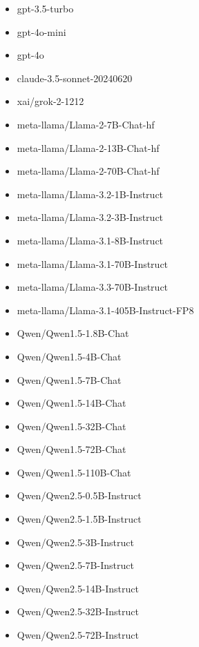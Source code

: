 \begin{itemize}
    \item gpt-3.5-turbo~\cite{openai2023gpt35turbofinetuning}
    \item gpt-4o-mini~\cite{openai2024gpt4o}
    \item gpt-4o~\cite{openai2024gpt4o}
    \item claude-3.5-sonnet-20240620~\cite{anthropic2024claude3}
    \item xai/grok-2-1212~\cite{grok2}

    \item meta-llama/Llama-2-7B-Chat-hf~\cite{touvron2023llama}
    \item meta-llama/Llama-2-13B-Chat-hf~\cite{touvron2023llama}
    \item meta-llama/Llama-2-70B-Chat-hf~\cite{touvron2023llama}

    \item meta-llama/Llama-3.2-1B-Instruct~\cite{dubey2024llama}
    \item meta-llama/Llama-3.2-3B-Instruct~\cite{dubey2024llama}
    \item meta-llama/Llama-3.1-8B-Instruct~\cite{dubey2024llama}
    \item meta-llama/Llama-3.1-70B-Instruct~\cite{dubey2024llama}
    \item meta-llama/Llama-3.3-70B-Instruct~\cite{dubey2024llama}
    \item meta-llama/Llama-3.1-405B-Instruct-FP8~\cite{dubey2024llama}

    \item Qwen/Qwen1.5-1.8B-Chat~\cite{qwen1.5}
    \item Qwen/Qwen1.5-4B-Chat~\cite{qwen1.5}
    \item Qwen/Qwen1.5-7B-Chat~\cite{qwen1.5}
    \item Qwen/Qwen1.5-14B-Chat~\cite{qwen1.5}
    \item Qwen/Qwen1.5-32B-Chat~\cite{qwen1.5}
    \item Qwen/Qwen1.5-72B-Chat~\cite{qwen1.5}
    \item Qwen/Qwen1.5-110B-Chat~\cite{qwen1.5}

    \item Qwen/Qwen2.5-0.5B-Instruct~\cite{qwen2,qwen25}
    \item Qwen/Qwen2.5-1.5B-Instruct~\cite{qwen2,qwen25}
    \item Qwen/Qwen2.5-3B-Instruct~\cite{qwen2,qwen25}
    \item Qwen/Qwen2.5-7B-Instruct~\cite{qwen2,qwen25}
    \item Qwen/Qwen2.5-14B-Instruct~\cite{qwen2,qwen25}
    \item Qwen/Qwen2.5-32B-Instruct~\cite{qwen2,qwen25}
    \item Qwen/Qwen2.5-72B-Instruct~\cite{qwen2,qwen25}


\end{itemize}
